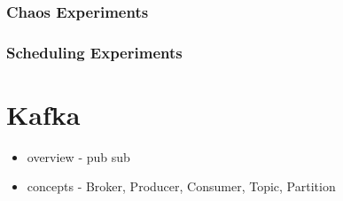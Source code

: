 \subsubsection{Chaos Experiments}

\subsubsection{Scheduling Experiments}

\section{Kafka} \label{background-kafka}

\begin{itemize}
	\item overview - pub sub
	\item concepts - Broker, Producer, Consumer, Topic, Partition
\end{itemize}

